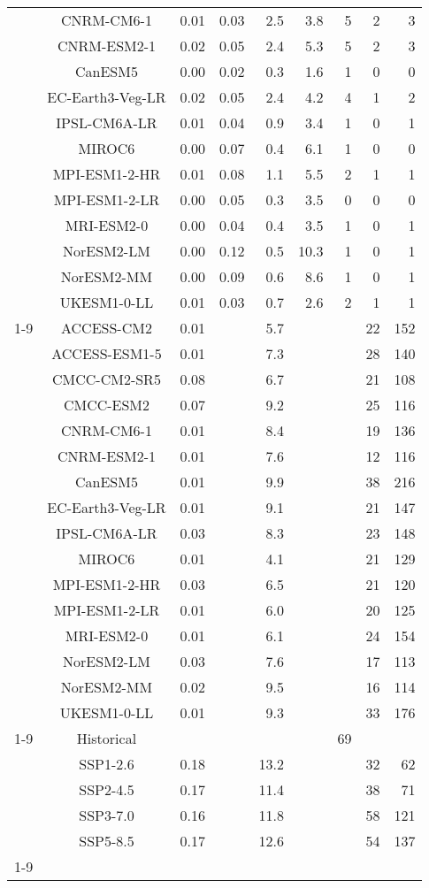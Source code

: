 \begin{table*}[t]
\begin{tabular}{c|c|rr|rr|rrr}
 & CNRM-CM6-1 & 0.01 & 0.03 & 2.5 & 3.8 & 5 & 2 & 3 \\
 & CNRM-ESM2-1 & 0.02 & 0.05 & 2.4 & 5.3 & 5 & 2 & 3 \\
 & CanESM5 & 0.00 & 0.02 & 0.3 & 1.6 & 1 & 0 & 0 \\
 & EC-Earth3-Veg-LR & 0.02 & 0.05 & 2.4 & 4.2 & 4 & 1 & 2 \\
 & IPSL-CM6A-LR & 0.01 & 0.04 & 0.9 & 3.4 & 1 & 0 & 1 \\
 & MIROC6 & 0.00 & 0.07 & 0.4 & 6.1 & 1 & 0 & 0 \\
 & MPI-ESM1-2-HR & 0.01 & 0.08 & 1.1 & 5.5 & 2 & 1 & 1 \\
 & MPI-ESM1-2-LR & 0.00 & 0.05 & 0.3 & 3.5 & 0 & 0 & 0 \\
 & MRI-ESM2-0 & 0.00 & 0.04 & 0.4 & 3.5 & 1 & 0 & 1 \\
 & NorESM2-LM & 0.00 & 0.12 & 0.5 & 10.3 & 1 & 0 & 1 \\
 & NorESM2-MM & 0.00 & 0.09 & 0.6 & 8.6 & 1 & 0 & 1 \\
 & UKESM1-0-LL & 0.01 & 0.03 & 0.7 & 2.6 & 2 & 1 & 1 \\
\cline{1-9}
\multirow[c]{16}{*}{Scenario uncertainty} & ACCESS-CM2 & 0.01 &  & 5.7 &  &  & 22 & 152 \\
 & ACCESS-ESM1-5 & 0.01 &  & 7.3 &  &  & 28 & 140 \\
 & CMCC-CM2-SR5 & 0.08 &  & 6.7 &  &  & 21 & 108 \\
 & CMCC-ESM2 & 0.07 &  & 9.2 &  &  & 25 & 116 \\
 & CNRM-CM6-1 & 0.01 &  & 8.4 &  &  & 19 & 136 \\
 & CNRM-ESM2-1 & 0.01 &  & 7.6 &  &  & 12 & 116 \\
 & CanESM5 & 0.01 &  & 9.9 &  &  & 38 & 216 \\
 & EC-Earth3-Veg-LR & 0.01 &  & 9.1 &  &  & 21 & 147 \\
 & IPSL-CM6A-LR & 0.03 &  & 8.3 &  &  & 23 & 148 \\
 & MIROC6 & 0.01 &  & 4.1 &  &  & 21 & 129 \\
 & MPI-ESM1-2-HR & 0.03 &  & 6.5 &  &  & 21 & 120 \\
 & MPI-ESM1-2-LR & 0.01 &  & 6.0 &  &  & 20 & 125 \\
 & MRI-ESM2-0 & 0.01 &  & 6.1 &  &  & 24 & 154 \\
 & NorESM2-LM & 0.03 &  & 7.6 &  &  & 17 & 113 \\
 & NorESM2-MM & 0.02 &  & 9.5 &  &  & 16 & 114 \\
 & UKESM1-0-LL & 0.01 &  & 9.3 &  &  & 33 & 176 \\
\cline{1-9}
\multirow[c]{5}{*}{Model uncertainty} & Historical &  &  &  &  & 69 &  &  \\
 & SSP1-2.6 & 0.18 &  & 13.2 &  &  & 32 & 62 \\
 & SSP2-4.5 & 0.17 &  & 11.4 &  &  & 38 & 71 \\
 & SSP3-7.0 & 0.16 &  & 11.8 &  &  & 58 & 121 \\
 & SSP5-8.5 & 0.17 &  & 12.6 &  &  & 54 & 137 \\
\cline{1-9}
\bottomrule
\end{tabular}
\end{table*}
